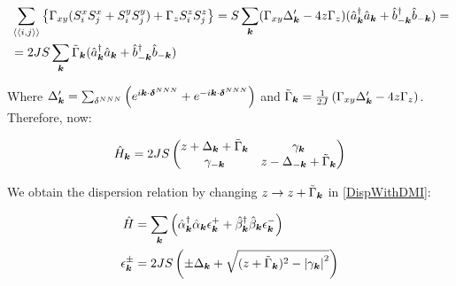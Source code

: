 \begin{align*}
&\sum_{\langle \langle i,j \rangle \rangle} \left\{ \Gamma_{xy}(S_i^xS_j^x + S_i^yS_j^y) + \Gamma_zS_i^zS_j^z\right\}
= S\sum_{\boldsymbol{k}} (\Gamma_{xy}\Delta'_{\boldsymbol{k}}-4z\Gamma_z) (\hat{a}^\dagger_{\boldsymbol{k}}\hat{a}_{\boldsymbol{k}}+\hat{b}^\dagger_{-\boldsymbol{k}}\hat{b}_{-\boldsymbol{k}}) = \\
&=2JS\sum_{\boldsymbol{k}} \tilde{\Gamma}_{\boldsymbol{k}}(\hat{a}^\dagger_{\boldsymbol{k}}\hat{a}_{\boldsymbol{k}}+\hat{b}^\dagger_{-\boldsymbol{k}}\hat{b}_{-\boldsymbol{k}})
\end{align*}

Where $\Delta'_{\boldsymbol{k}} = \sum_{\delta^{NNN}} \left( e^{i\boldsymbol{k}\cdot \boldsymbol{\delta}^{NNN}} +  e^{-i\boldsymbol{k}\cdot \boldsymbol{\delta}^{NNN}}\right)$ and $\tilde{\Gamma}_{\boldsymbol{k}} = \frac{1}{2J}\left( \Gamma_{xy}\Delta'_{\boldsymbol{k}}-4z\Gamma_z \right)$. Therefore, now:

\begin{equation}
\hat{H}_{\boldsymbol{k}} = 2JS\begin{pmatrix} 
z + \Delta_{\boldsymbol{k}} + \tilde{\Gamma}_{\boldsymbol{k}} & \gamma_{\boldsymbol{k}} \\
\gamma_{-\boldsymbol{k}} & z - \Delta_{-\boldsymbol{k}} + \tilde{\Gamma}_{\boldsymbol{k}}
\end{pmatrix}
\end{equation}

We obtain the dispersion relation by changing $z \rightarrow z + \tilde{\Gamma}_{\boldsymbol{k}}$ in \ref{DispWithDMI}:

\begin{align}
\hat{H} &= \sum_{\boldsymbol{k}} \left( \hat{\alpha}_{\boldsymbol{k}}^\dagger \hat{\alpha}_{\boldsymbol{k}} \epsilon_{\boldsymbol{k}}^+ +\hat{\beta}_{\boldsymbol{k}}^\dagger \hat{\beta}_{\boldsymbol{k}}  \epsilon_{\boldsymbol{k}}^- \right) \label{DispWithDMI} \\
\epsilon_{\boldsymbol{k}}^\pm &= 2JS \left( \pm \Delta_{\boldsymbol{k}} +  \sqrt{(z + \tilde{\Gamma}_{\boldsymbol{k}})^2-\abs{\gamma_{\boldsymbol{k}}}^2} \right)
\end{align}

